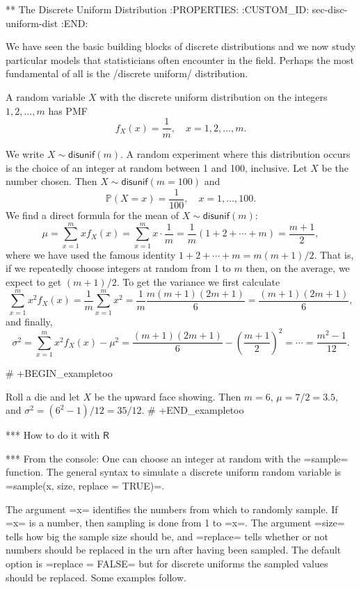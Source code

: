 ** The Discrete Uniform Distribution
:PROPERTIES:
:CUSTOM_ID: sec-disc-uniform-dist
:END:

We have seen the basic building blocks of discrete distributions and
we now study particular models that statisticians often encounter in
the field. Perhaps the most fundamental of all is the /discrete
uniform/ distribution.

A random variable \(X\) with the discrete uniform distribution on the
integers \(1,2,\ldots,m\) has PMF
\begin{equation}
f_{X}(x)=\frac{1}{m},\quad x=1,2,\ldots,m.
\end{equation}

We write \(X\sim\mathsf{disunif}(m)\). A random experiment where this
distribution occurs is the choice of an integer at random between 1
and 100, inclusive. Let \(X\) be the number chosen. Then
\(X\sim\mathsf{disunif}(m=100)\) and
\[
\mathbb{P}(X=x)=\frac{1}{100},\quad x=1,\ldots,100.
\]
We find a direct formula for the mean of \(X\sim\mathsf{disunif}(m)\):
\begin{equation}
\mu = \sum_{x = 1}^{m}xf_{X}(x) = \sum_{x = 1}^{m}x \cdot \frac{1}{m} = \frac{1}{m}(1 + 2 + \cdots + m) = \frac{m + 1}{2},
\end{equation}
where we have used the famous identity \(1 + 2 + \cdots + m = m(m +
1)/2\). That is, if we repeatedly choose integers at random from 1 to
\(m\) then, on the average, we expect to get \((m+1)/2\). To get the
variance we first calculate \[ \sum_{x = 1}^{m} x^{2} f_{X}(x) =
\frac{1}{m} \sum_{x = 1}^{m} x^{2} = \frac{1}{m}\frac{m(m + 1)(2m +
1)}{6} = \frac{(m + 1)(2m + 1)}{6}, \] and finally,
\begin{equation}
\sigma^{2} = \sum_{x = 1}^{m} x^{2} f_{X}(x) - \mu^{2} = \frac{(m + 1)(2m + 1)}{6} - \left(\frac{m + 1}{2}\right)^{2} = \cdots = \frac{m^{2} - 1}{12}.
\end{equation}

# +BEGIN_exampletoo

Roll a die and  let \(X\) be the upward face showing.  Then \(m = 6\),
\(\mu = 7/2 = 3.5\), and \(\sigma^{2} = (6^{2} - 1)/12 = 35/12\).
# +END_exampletoo

*** How to do it with \(\mathsf{R}\)

*** From the console:
One can choose an integer at random with the =sample= function. The
general syntax to simulate a discrete uniform random variable is
=sample(x, size, replace = TRUE)=.

The argument =x= identifies the numbers from which to randomly
sample. If =x= is a number, then sampling is done from 1 to =x=. The
argument =size= tells how big the sample size should be, and =replace=
tells whether or not numbers should be replaced in the urn after
having been sampled. The default option is =replace = FALSE= but for
discrete uniforms the sampled values should be replaced. Some examples
follow.

